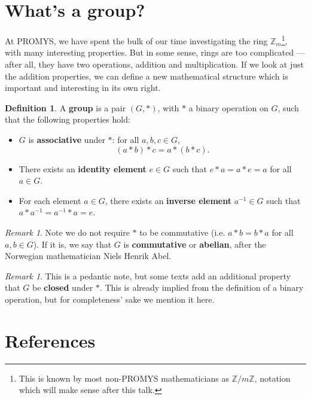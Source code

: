 \documentclass[letterpaper]{article}
\theoremstyle{definition}
\newtheorem{definition}[theorem]{Definition}
\theoremstyle{remark}
\newtheorem{remark}[theorem]{Remark}
\newcommand\ZZ{\mathbb{Z}}
\begin{document}
\section{What's a group?}

At PROMYS, we have spent the bulk of our time investigating the ring \(\ZZ_m\)\footnote{This is known by most non-PROMYS mathematicians as \(\ZZ/m\ZZ{}\), notation which will make sense after this talk.}, with many interesting properties. But in some sense, rings are too complicated --- after all, they have two operations, addition and multiplication. If we look at just the addition properties, we can define a new mathematical structure which is important and interesting in its own right. 

\begin{definition}
	A \textbf{group} is a pair \((G,\ast)\), with \(\ast\) a binary operation on \(G\), such that the following properties hold: 
	\begin{itemize}
		\item \(G\) is \textbf{associative} under \(\ast\): for all \(a,b,c\in G\), \[(a\ast b)\ast c=a\ast(b\ast c).\]
		\item There exists an \textbf{identity element} \(e\in G\) such that \(e\ast a=a\ast e=a\) for all \(a\in G\). 
		\item For each element \(a\in G\), there exists an \textbf{inverse element} \(a^{-1}\in G\) such that \(a\ast a^{-1}=a^{-1}\ast a=e\). 
	\end{itemize}
\end{definition}

\begin{remark}
	Note we do not require \(\ast\) to be commutative (i.e. \(a\ast b=b\ast a\) for all \(a,b\in G\)). If it is, we say that \(G\) is \textbf{commutative} or \textbf{abelian}, after the Norwegian mathematician Niels Henrik Abel. 
\end{remark}

\begin{remark}
	This is a pedantic note, but some texts add an additional property that \(G\) be \textbf{closed} under \(\ast\). This is already implied from the definition of a binary operation, but for completeness' sake we mention it here. 
\end{remark}

\section{References}
\end{document}
